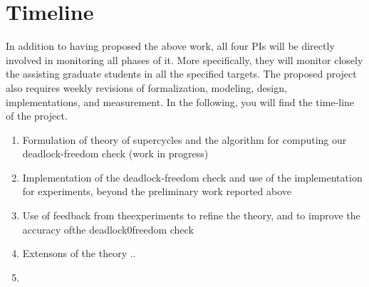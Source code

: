 \section{Timeline}

In addition to having proposed the above work, all four PIs will be
directly involved in monitoring all phases of it. More specifically,
they will monitor closely the assisting graduate students in all the
specified targets. The proposed project also requires weekly revisions
of formalization, modeling, design, implementations, and
measurement. In the following, you will find the time-line of the
project.

\begin{enumerate}
\item Formulation of theory of supercycles and the algorithm for
  computing our deadlock-freedom check (work in progress)

\item Implementation of the deadlock-freedom check and use of the
  implementation for experiments, beyond the preliminary work reported above

\item Use of feedback from theexperiments to refine the theory, and to
  improve the accuracy ofthe deadlock0freedom check

\item Extensons of the theory ..

\item 
\end{enumerate}
